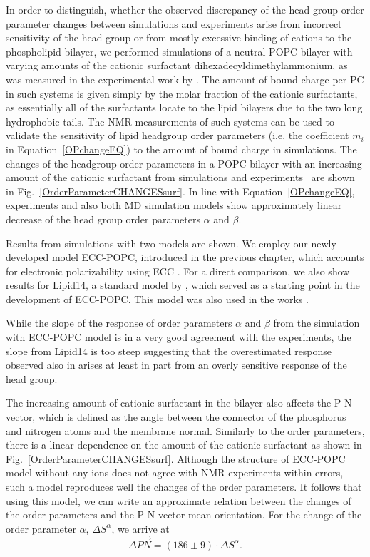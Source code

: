 In order to distinguish, whether the observed discrepancy of the head group order parameter changes between simulations and experiments 
arise from incorrect sensitivity of the head group or from mostly excessive binding of cations to the phospholipid bilayer,
we performed simulations of a neutral POPC bilayer with varying amounts of the cationic surfactant dihexadecyldimethylammonium, 
as was measured in the experimental work by \citet{scherer89}.
The amount of bound charge per PC 
in such systems is given simply by the molar fraction of the cationic surfactants, 
as essentially all of the surfactants locate to the lipid bilayers 
due to the two long hydrophobic tails.
The NMR measurements of such systems  
can be used to validate the sensitivity of lipid headgroup order parameters 
(i.e. the coefficient $m_i$ in Equation~\ref{OPchangeEQ}) 
to the amount of bound charge in simulations. 
The changes of the headgroup order parameters in a POPC bilayer with an increasing amount of 
the cationic surfactant from simulations and experiments~\citep{scherer89} are shown in Fig.~\ref{OrderParameterCHANGESsurf}.
In line with Equation~\ref{OPchangeEQ},
experiments and also both MD simulation models show approximately linear decrease of the head group order parameters $\alpha$ and $\beta$.

Results from simulations with two models are shown.
We employ our newly developed model ECC-POPC, introduced in the previous chapter, 
which accounts for electronic polarizability using ECC \citep{leontyev14}.
For a direct comparison, we also show results for Lipid14, a standard model by \citet{dickson14},
which served as a starting point in the development of ECC-POPC. 
This model was also used in the works \citep{catte16, nmrlipids_proj4}. 

While the slope of the response of order parameters $\alpha$ and $\beta$ 
from the simulation with ECC-POPC model 
is in a very good agreement with the experiments, 
the slope from Lipid14 is too steep
suggesting that the overestimated response observed also in \citep{catte16}
arises at least in part from an overly sensitive response of the head group. 

The increasing amount of cationic surfactant in the bilayer
also affects the P-N vector, 
which is defined as the angle between the connector of the phosphorus and nitrogen atoms and the membrane normal. 
Similarly to the order parameters, 
there is a linear dependence on the amount of the cationic surfactant
as shown in Fig.~\ref{OrderParameterCHANGESsurf}. 
Although the structure of ECC-POPC model without any ions does not agree with NMR experiments within errors,
such a model reproduces well the changes of the order parameters.
It follows that using this model,
we can write an approximate relation between the changes of the order parameters and the P-N vector mean orientation. 
For the change of the order parameter $\alpha$, $\Delta S^\alpha$, we arrive at
\begin{equation}
\Delta \vec{PN} = (186 \pm 9) \cdot \Delta S^\alpha .
\end{equation}

